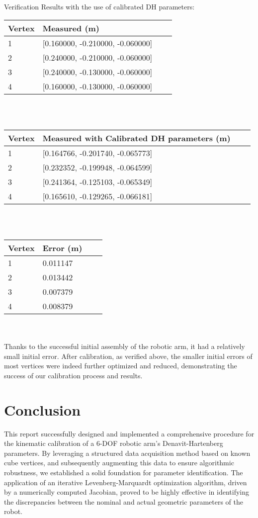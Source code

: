 \documentclass[conference]{IEEEtran}
\begin{document}
Verification Results with the use of calibrated DH parameters:\\
\begin{tabular}{llll}
\toprule
Vertex & Measured (m)\\
\midrule
1 & [0.160000, -0.210000, -0.060000]\\
2 & [0.240000, -0.210000, -0.060000]\\
3 & [0.240000, -0.130000, -0.060000]\\
4 & [0.160000, -0.130000, -0.060000]\\
\bottomrule
\end{tabular}
\\\\

\begin{tabular}{llll}
\toprule
Vertex & Measured with Calibrated DH parameters (m) \\
\midrule
1 & [0.164766, -0.201740, -0.065773]\\
2 & [0.232352, -0.199948, -0.064599]\\
3 & [0.241364, -0.125103, -0.065349]\\
4 & [0.165610, -0.129265, -0.066181]\\
\bottomrule
\end{tabular}
\\\\

\begin{tabular}{llll}
\toprule
Vertex & Error (m) \\
\midrule
1 & 0.011147 \\
2 & 0.013442 \\
3 & 0.007379 \\
4 & 0.008379 \\
\bottomrule
\end{tabular}
\\\\

\ident Thanks to the successful initial assembly of the robotic arm, it had a relatively small initial error. After calibration, as verified above, the smaller initial errors of most vertices were indeed further optimized and reduced, demonstrating the success of our calibration process and results.


\section{Conclusion}
This report successfully designed and implemented a comprehensive procedure for the kinematic calibration of a 6-DOF robotic arm's Denavit-Hartenberg parameters. By leveraging a structured data acquisition method based on known cube vertices, and subsequently augmenting this data to ensure algorithmic robustness, we established a solid foundation for parameter identification. The application of an iterative Levenberg-Marquardt optimization algorithm, driven by a numerically computed Jacobian, proved to be highly effective in identifying the discrepancies between the nominal and actual geometric parameters of the robot.
\end{document}
